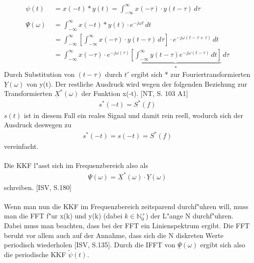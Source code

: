 \begin{align}
\psi(t) \  \; &= x(-t) * y(t) = \int_{-\infty}^{\infty} x(-\tau) \cdot y(t-\tau)\,d\tau\\\\
\underline \Psi(\omega) &=\int_{-\infty}^{\infty} x(-t) * y(t) \cdot e^{-j\omega t} \,dt\\&=\int_{-\infty}^{\infty} \left[ \int_{-\infty}^{\infty} x(-\tau) \cdot y(t-\tau)\,d\tau \right] \cdot e^{-j\omega (t - \tau + \tau)} \,dt\\&=\int_{-\infty}^{\infty} x(-\tau) \cdot e^{-j\omega(\tau)} \underbrace{ \left[ \int_{-\infty}^{\infty} y(t-\tau) e^{-j\omega (t - \tau)} \,dt \right]}_* \,d\tau
\end{align}
Durch Substitution von $(t-\tau)$ durch $t'$ ergibt sich * zur Fouriertransformierten $ \underline{Y}(\omega)$ von y(t). Der restliche Ausdruck wird wegen der folgenden Beziehung zur Transformierten $ \underline{X}^*(\omega)$ der Funktion x(-t). [NT, S. 103 A1]
\begin{align}
s^*(-t) = S^*(f)
\end{align}
$s(t)$ ist in diesem Fall ein reales Signal und damit rein reell, wodurch sich der Ausdruck deswegen zu
\begin{align}
s^*(-t) = s(-t) = S^*(f)
\end{align}
vereinfacht.\\\\
Die KKF l"asst sich im Frequenzbereich also als
\begin{align}
\boxed{\underline \Psi(\omega) = \underline{X}^*(\omega) \cdot \underline{Y}(\omega)}
\end{align}
schreiben. [ISV, S.180]
\\\\
Wenn man nun die KKF im Frequenzbereich zeitsparend durchf"uhren will, muss man die FFT f"ur x(k) und y(k) (dabei $k \in \mathbb{N}^+_0$) der L"ange N durchf"uhren. Dabei muss man beachten, dass bei der FFT ein Linienspektrum ergibt. Die FFT beruht vor allem auch auf der Annahme, dass sich die N diskreten Werte periodisch wiederholen [ISV, S.135]. Durch die IFFT von $ \underline \Psi(\omega)$ ergibt sich also die periodische KKF $\tilde{\psi}(t)$.
